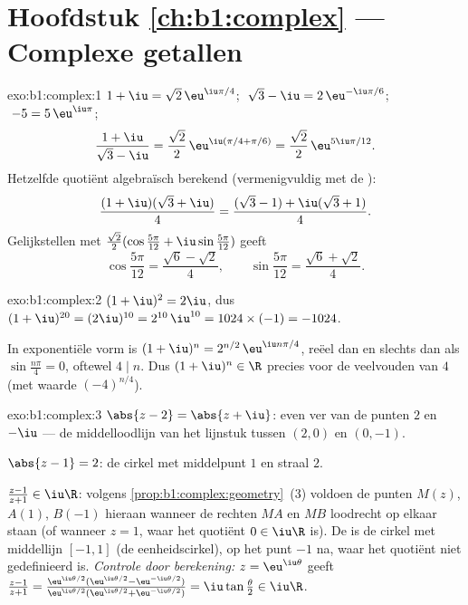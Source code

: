 \section*{Hoofdstuk \ref{ch:b1:complex} --- Complexe getallen}

\begin{solution}{exo:b1:complex:1}
$1 + \iu = \sqrt 2\, \eu^{\iu\pi/4}$;
$\;\sqrt 3 - \iu = 2\, \eu^{-\iu\pi/6}$;
$\;-5 = 5\, \eu^{\iu\pi}$;
\[
\frac{1 + \iu}{\sqrt 3 - \iu}
= \frac{\sqrt 2}{2}\, \eu^{\iu(\pi/4 + \pi/6)}
= \frac{\sqrt 2}{2}\, \eu^{5\iu\pi/12}.
\]
Hetzelfde quotiënt algebraïsch berekend (vermenigvuldig met de
):
\[
\frac{(1 + \iu)(\sqrt 3 + \iu)}{4}
= \frac{(\sqrt 3 - 1) + \iu(\sqrt 3 + 1)}{4}.
\]
Gelijkstellen met $\frac{\sqrt 2}{2}(\cos\frac{5\pi}{12} +
\iu\sin\frac{5\pi}{12})$ geeft
\[
\cos\frac{5\pi}{12} = \frac{\sqrt 6 - \sqrt 2}{4},
\qquad
\sin\frac{5\pi}{12} = \frac{\sqrt 6 + \sqrt 2}{4}.
\]
\end{solution}

\begin{solution}{exo:b1:complex:2}
$(1+\iu)^2 = 2\iu$, dus $(1+\iu)^{20} = (2\iu)^{10} = 2^{10}\,\iu^{10}
= 1024 \times (-1) = -1024$.

In exponentiële vorm is $(1+\iu)^n = 2^{n/2}\, \eu^{\iu n\pi/4}$, reëel
dan en slechts dan als $\sin\frac{n\pi}{4} = 0$, oftewel $4 \mid n$. Dus
$(1+\iu)^n \in \R$ precies voor de veelvouden van $4$ (met waarde
$(-4)^{n/4}$).
\end{solution}

\begin{solution}{exo:b1:complex:3}
$\abs{z - 2} = \abs{z + \iu}$: even ver van de punten $2$ en $-\iu$ ---
de middelloodlijn van het lijnstuk tussen $(2, 0)$ en $(0, -1)$.

$\abs{z - 1} = 2$: de cirkel met middelpunt $1$ en straal $2$.

$\frac{z-1}{z+1} \in \iu\R$: volgens
\cref{prop:b1:complex:geometry}~(3) voldoen de punten $M(z)$, $A(1)$,
$B(-1)$ hieraan wanneer de rechten $MA$ en $MB$ loodrecht op elkaar
staan (of wanneer $z = 1$, waar het quotiënt $0 \in \iu\R$ is). De
 is de cirkel met middellijn $[-1, 1]$ (de eenheidscirkel),
op het punt $-1$ na, waar het quotiënt niet gedefinieerd is.
\emph{Controle door berekening:} $z = \eu^{\iu\theta}$ geeft
$\frac{z-1}{z+1} = \frac{\eu^{\iu\theta/2}(\eu^{\iu\theta/2} -
\eu^{-\iu\theta/2})}{\eu^{\iu\theta/2}(\eu^{\iu\theta/2} +
\eu^{-\iu\theta/2})} = \iu\tan\frac\theta2 \in \iu\R$.
\end{solution}

